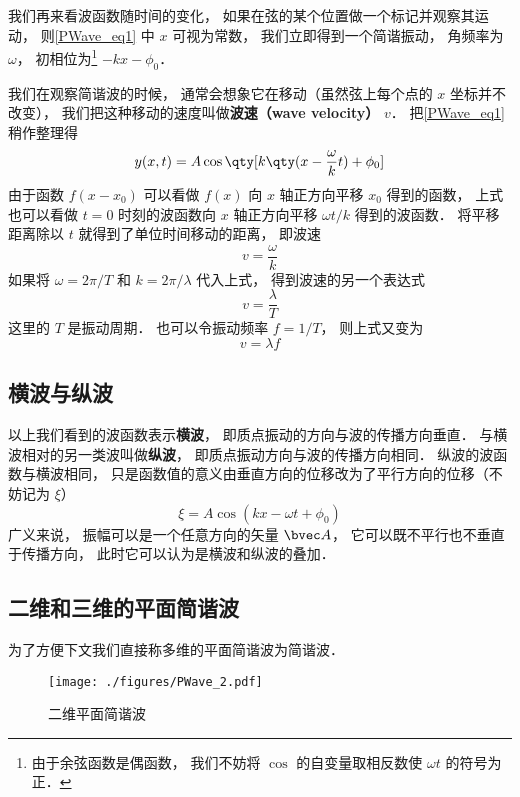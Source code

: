 我们再来看波函数随时间的变化， 如果在弦的某个位置做一个标记并观察其运动， 则\autoref{PWave_eq1} 中 $x$ 可视为常数， 我们立即得到一个简谐振动， 角频率为 $\omega$， 初相位为\footnote{由于余弦函数是偶函数， 我们不妨将 $\cos$ 的自变量取相反数使 $\omega t$ 的符号为正．} $-kx - \phi_0$．

我们在观察简谐波的时候， 通常会想象它在移动（虽然弦上每个点的 $x$ 坐标并不改变）， 我们把这种移动的速度叫做\textbf{波速（wave velocity）} $v$． 把\autoref{PWave_eq1} 稍作整理得
\begin{equation}
y(x, t) = A\cos \qty[k \qty(x - \frac{\omega}{k} t) + \phi_0]
\end{equation}
由于函数 $f(x - x_0)$ 可以看做 $f(x)$ 向 $x$ 轴正方向平移 $x_0$ 得到的函数， 上式也可以看做 $t = 0$ 时刻的波函数向 $x$ 轴正方向平移 $\omega t/k$ 得到的波函数． 将平移距离除以 $t$ 就得到了单位时间移动的距离， 即波速
\begin{equation}
v = \frac{\omega}{k}
\end{equation}
如果将 $\omega = 2\pi/T$ 和 $k = 2\pi/\lambda$ 代入上式， 得到波速的另一个表达式
\begin{equation}
v = \frac{\lambda}{T}
\end{equation}
这里的 $T$ 是振动周期． 也可以令振动频率 $f = 1/T$， 则上式又变为
\begin{equation}
v = \lambda f
\end{equation}

\subsection{横波与纵波}
以上我们看到的波函数表示\textbf{横波}， 即质点振动的方向与波的传播方向垂直． 与横波相对的另一类波叫做\textbf{纵波}， 即质点振动方向与波的传播方向相同． 纵波的波函数与横波相同， 只是函数值的意义由垂直方向的位移改为了平行方向的位移（不妨记为 $\xi$）
\begin{equation}
\xi = A \cos(k x - \omega t + \phi_0)
\end{equation}
广义来说， 振幅可以是一个任意方向的矢量 $\bvec A$， 它可以既不平行也不垂直于传播方向， 此时它可以认为是横波和纵波的叠加．

\subsection{二维和三维的平面简谐波}
为了方便下文我们直接称多维的平面简谐波为简谐波．

\begin{figure}[ht]
\centering
\texttt{[image: ./figures/PWave\_2.pdf]}
\caption{二维平面简谐波} \label{PWave_fig2}
\end{figure}


